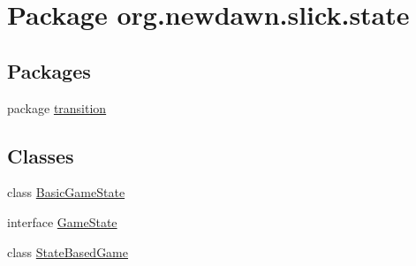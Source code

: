 \hypertarget{namespaceorg_1_1newdawn_1_1slick_1_1state}{}\section{Package org.\+newdawn.\+slick.\+state}
\label{namespaceorg_1_1newdawn_1_1slick_1_1state}
\subsection*{Packages}
\begin{DoxyCompactItemize}
\item 
package \mbox{\hyperlink{namespaceorg_1_1newdawn_1_1slick_1_1state_1_1transition}{transition}}
\end{DoxyCompactItemize}
\subsection*{Classes}
\begin{DoxyCompactItemize}
\item 
class \mbox{\hyperlink{classorg_1_1newdawn_1_1slick_1_1state_1_1_basic_game_state}{Basic\+Game\+State}}
\item 
interface \mbox{\hyperlink{interfaceorg_1_1newdawn_1_1slick_1_1state_1_1_game_state}{Game\+State}}
\item 
class \mbox{\hyperlink{classorg_1_1newdawn_1_1slick_1_1state_1_1_state_based_game}{State\+Based\+Game}}
\end{DoxyCompactItemize}
